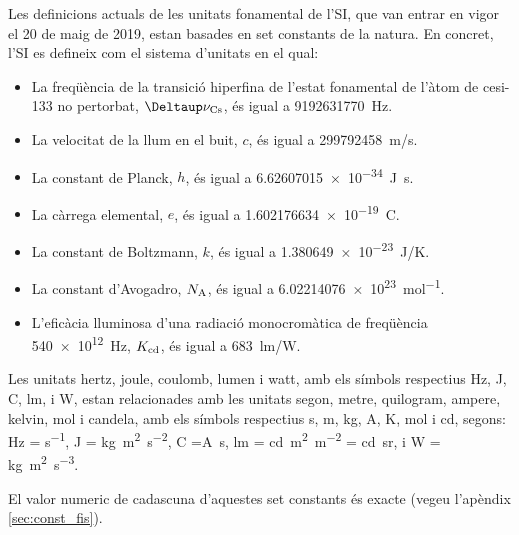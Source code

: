 Les definicions actuals de les unitats fonamental de l'SI, que van entrar en vigor el 20 de maig de 2019, estan basades en set constants de la natura. En concret, l'SI es defineix com el  sistema d'unitats en el qual:
\begin{itemize}

\item La freqüència de la transició hiperfina de l'estat fonamental de l'àtom de cesi-133 no pertorbat, $\Deltaup\nu\ped{Cs}$, és igual a \SI{9 192 631 770}{Hz}.
\item La velocitat de la llum en el buit, $c$, és igual a \SI{299792458}{m/s}.
\item La constant de Planck, $h$, és igual a \SI{6,62607015 e-34}{J.s}.
\item La càrrega elemental, $e$, és igual a \SI{1,602176634 e-19}{C}.
\item La constant de Boltzmann, $k$, és igual a \SI{1,380649e-23}{J/K}.
\item La constant d'Avogadro, $N_\mathrm{A}$, és igual a \SI{6,02214076 e23}{mol^{-1}}.
\item L'eficàcia lluminosa d'una radiació monocromàtica de freqüència \SI{540e12}{Hz},  $K_\mathrm{cd}$, és igual a \SI{683}{lm/W}.
\end{itemize}
 
 


Les unitats  hertz, joule, coulomb, lumen i watt, amb els símbols respectius Hz, J, C, lm, i W, estan relacionades amb les unitats segon, metre, quilogram, ampere, kelvin, mol i candela, amb els símbols respectius s, m, kg, A, K, mol i cd, segons:  Hz = \si{s^{-1}}, J = \si{kg.m^2.s^{-2}}, C =\si{A.s}, lm = \si{cd.m^2.m^{-2}} = \si{cd.sr}, i W = \si{kg.m^2.s^{-3}}.

El valor numeric de cadascuna d'aquestes set constants és exacte (vegeu l'apèndix \vref{sec:const_fis}).

